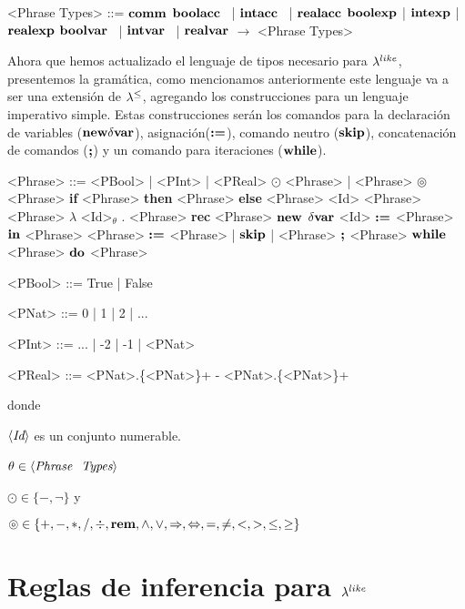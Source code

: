 \setlength{\grammarindent}{8em}
\begin{grammar}

<Phrase Types> ::= $\textbf{comm}$
\alt $\textbf{boolacc}$ \ | $\textbf{intacc}$ \ | $\textbf{realacc}$
\alt $\textbf{boolexp}$ | $\textbf{intexp}$ | $\textbf{realexp}$
\alt $\textbf{boolvar}$ \ | $\textbf{intvar}$ \ | $\textbf{realvar}$
 $\rightarrow$ <Phrase Types>

\end{grammar}

Ahora que hemos actualizado el lenguaje de tipos necesario para $\lambda^{like}$, presentemos
la gram\'atica, como mencionamos anteriormente este lenguaje va a ser una extensi\'on de $\lambda^{\leq}$, agregando los construcciones para un lenguaje imperativo simple. Estas construcciones 
ser\'an los comandos para la declaraci\'on de variables ($\textbf{new} \delta \textbf{var}$), 
asignaci\'on($\textbf{:=}$), comando neutro ($\textbf{skip}$), concatenaci\'on de comandos ($\textbf{;}$)
y un comando para iteraciones ($\textbf{while}$).

\setlength{\grammarindent}{6em}
\begin{grammar}

<Phrase> ::= <PBool> | <PInt> | <PReal>
\alt $\odot$ <Phrase> | <Phrase> $\circledcirc$ <Phrase>
\alt \textbf{if} <Phrase> \textbf{then} <Phrase> \textbf{else} <Phrase>
\alt <Id> 
\alt <Phrase> <Phrase>
\alt $\lambda$ <Id>$_\theta$ . <Phrase>
\alt \textbf{rec} <Phrase>
\alt $\textbf{new}$ $\delta \textbf{var}$ <Id> $\textbf{:=}$ <Phrase> $\textbf{in}$ <Phrase>
\alt <Phrase> $\textbf{:=}$ <Phrase> | $\textbf{skip}$ | <Phrase> $\textbf{;}$ <Phrase>
\alt $\textbf{while}$ <Phrase> $\textbf{do}$ <Phrase>


<PBool> ::= True | False

<PNat>  ::= 0 | 1 | 2 | ...

<PInt>  ::= ... | -2 | -1 | <PNat> 

<PReal> ::= <PNat>.\{<PNat>\}+ 
\alt - <PNat>.\{<PNat>\}+

\end{grammar}

\noindent
donde \ 

$\langle \textit{Id} \rangle$ es un conjunto numerable.

$\theta \in \langle \textit{Phrase \ Types} \rangle$ \

$\odot \in \{-, \neg\}$ y \

$\circledcirc \in \{+,-,*,/,\div,\textbf{rem},\wedge,\vee,\Rightarrow,\Leftrightarrow, =,\neq,<,>,\leq,\geq\}$

\section{Reglas de inferencia para $\lambda^{like}$}

